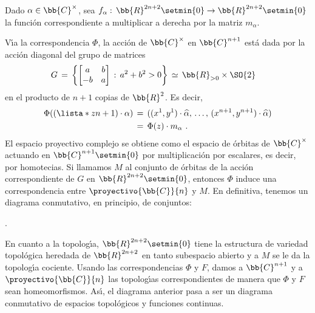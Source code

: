 \begin{ejemplo}
	Dado $\alpha\in\bb{C}^{\times}$, sea
	$f_{\alpha}:\,\bb{R}^{2n+2}\setmin\{0\}\rightarrow%
		\bb{R}^{2n+2}\setmin\{0\}$ la funci\'{o}n correspondiente a
	multiplicar a derecha por la matriz $m_{\alpha}$.

	V\'{\i}a la correspondencia $\Phi$, la acci\'{o}n de
	$\bb{C}^{\times}$ en $\bb{C}^{n+1}$ est\'{a} dada por la acci\'{o}n
	diagonal del grupo de matrices
	\begin{align*}
		G & \,=\,\left\lbrace
			\begin{bmatrix}a & b\\ -b & a\end{bmatrix}\,:\,
			a^{2}+b^{2}>0\right\rbrace
		\,\simeq\,\bb{R}_{>0}\times\SO{2}
	\end{align*}
	en el producto de $n+1$ copias de $\bb{R}^{2}$. Es decir,
	\begin{align*}
		\Phi((\lista*{z}{n+1})\cdot\alpha) & \,=\,
			((x^{1},y^{1})\cdot\widehat{\alpha},\,\dots,\,
			(x^{n+1},y^{n+1})\cdot\widehat{\alpha}) \\
		& \,=\,\Phi(z)\cdot m_{\alpha}
		\text{ .}
	\end{align*}
	El espacio proyectivo complejo se obtiene como el espacio de
	\'{o}rbitas de $\bb{C}^{\times}$ actuando en $\bb{C}^{n+1}\setmin\{0\}$
	por multiplicaci\'{o}n por escalares, es decir, por homotecias.
	Si llamamos $M$ al conjunto de \'{o}rbitas de la acci\'{o}n
	correspondiente de $G$ en $\bb{R}^{2n+2}\setmin\{0\}$, entonces
	$\Phi$ induce una correspondencia entre $\proyectivo{\bb{C}}{n}$ y
	$M$. En definitiva, tenemos un diagrama conmutativo, en principio, de
	conjuntos:
	\begin{center}
	 .
	\end{center}

	En cuanto a la topolog\'{\i}a, $\bb{R}^{2n+2}\setmin\{0\}$
	tiene la estructura de variedad topol\'{o}gica heredada de
	$\bb{R}^{2n+2}$ en tanto subespacio abierto y a $M$ se le da la
	topolog\'{\i}a cociente. Usando las correspondencias $\Phi$ y $F$,
	damos a $\bb{C}^{n+1}$ y a $\proyectivo{\bb{C}}{n}$ las
	topolog\'{\i}as correspondientes de manera que $\Phi$ y $F$ sean
	homeomorfismos. As\'{\i}, el diagrama anterior pasa a ser un diagrama
	conmutativo de espacios topol\'{o}gicos y funciones continuas.


\end{ejemplo}
